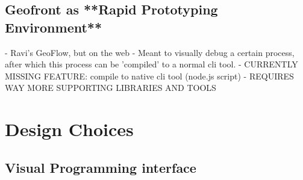 




\subsection{Geofront as **Rapid Prototyping Environment**} 
  - Ravi's GeoFlow, but on the web
    - Meant to visually debug a certain process, after which this process can be 'compiled' to a normal cli tool.
  - CURRENTLY MISSING FEATURE: compile to native cli tool (node.js script)
  - REQUIRES WAY MORE SUPPORTING LIBRARIES AND TOOLS

\section{Design Choices}

\subsection{Visual Programming interface}



